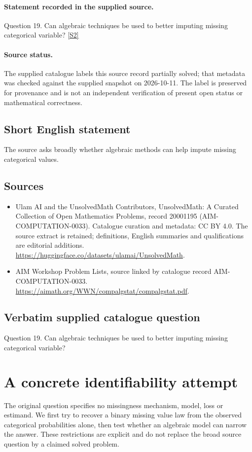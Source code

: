 \documentclass[11pt]{article}
\begin{document}
\paragraph{Statement recorded in the supplied source.}
Question 19. Can algebraic techniques be used to better imputing missing categorical variable? \href{https://aimath.org/WWN/compalgstat/compalgstat.pdf}{[S2]}
\paragraph{Source status.}
The supplied catalogue labels this source record partially solved; that metadata was checked against the supplied snapshot on 2026-10-11. The label is preserved for provenance and is not an independent verification of present open status or mathematical correctness.
\subsection{Short English statement}
The source asks broadly whether algebraic methods can help impute missing categorical values.
\subsection{Sources}
\begin{itemize}
\item[S1] Ulam AI and the UnsolvedMath Contributors, UnsolvedMath: A Curated Collection of Open Mathematics Problems, record 20001195 (AIM-COMPUTATION-0033). Catalogue curation and metadata: CC BY 4.0. The source extract is retained; definitions, English summaries and qualifications are editorial additions.
\url{https://huggingface.co/datasets/ulamai/UnsolvedMath}.
\item[S2] AIM Workshop Problem Lists, source linked by catalogue record AIM-COMPUTATION-0033.
\url{https://aimath.org/WWN/compalgstat/compalgstat.pdf}.
\end{itemize}
\subsection{Verbatim supplied catalogue question}
Question 19. Can algebraic techniques be used to better imputing missing categorical variable?

\section{A concrete identifiability attempt}
The original question specifies no missingness mechanism, model, loss or
estimand. We first try to recover a binary missing value law from the
observed categorical probabilities alone, then test whether an algebraic
model can narrow the answer. These restrictions are explicit and do not
replace the broad source question by a claimed solved problem.
\end{document}
